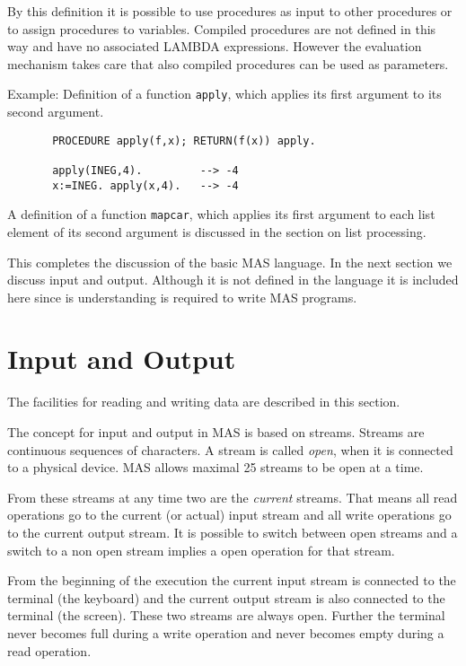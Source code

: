 By this definition it is    
possible to use procedures as input to 
other procedures or to assign procedures to variables.
Compiled procedures are not defined 
in this way and have no associated LAMBDA expressions. 
However the evaluation mechanism takes care
that also compiled procedures can be used
as parameters.

Example:
Definition of a function \verb/apply/, which
applies its first argument to its second argument.
\begin{verbatim}
       PROCEDURE apply(f,x); RETURN(f(x)) apply.

       apply(INEG,4).         --> -4
       x:=INEG. apply(x,4).   --> -4
\end{verbatim}

A definition of a function \verb/mapcar/, which
applies its first argument 
to each list element of its second argument
is discussed in the section on list processing.

This completes the discussion of the basic MAS language.
In the next section we discuss input and output.
Although it is not defined in the language 
it is included here since is understanding is required to 
write MAS programs.


\section{Input and Output}

The facilities for reading and writing data 
are described in this section.

The concept for input and output in MAS is
based on streams. Streams are continuous sequences of
characters.
A stream is called {\em open}, when it is connected
to a physical device. MAS allows maximal 25 streams to be open
at a time.

From these streams at any time two are the
{\em current} streams. That means all read operations
go to the current (or actual) input stream 
and all write operations
go to the current output stream.
It is possible to switch between open streams and 
a switch to a non open stream implies
a open operation for that stream.

From the beginning of the execution the
current input stream is connected to the
terminal (the keyboard) and the 
current output stream is also connected to  
the terminal (the screen).
These two streams are always open. 
Further the terminal never becomes full during a write operation
and never becomes empty during a read operation.

